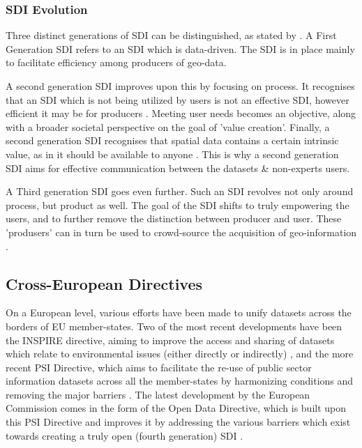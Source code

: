 \subsubsection{SDI Evolution}

Three distinct generations of SDI can be distinguished, as stated by \citet{expanding_knowledge_base}. A First Generation SDI refers to an SDI which is data-driven. The SDI is in place mainly to facilitate efficiency among producers of geo-data. 

A second generation SDI improves upon this by focusing on process. It recognises that an SDI which is not being utilized by users is not an effective SDI, however efficient it may be for producers \citep{geo1009_course}. Meeting user needs becomes an objective, along with a broader societal perspective on the goal of 'value creation'. Finally, a second generation SDI recognises that spatial data contains a certain intrinsic value, as in it should be available to anyone \citep{geo1009_course}. This is why a second generation SDI aims for effective communication between the datasets \& non-experts users.

A Third generation SDI goes even further. Such an SDI revolves not only around process, but product as well. The goal of the SDI shifts to truly empowering the users, and to further remove the distinction between producer and user. These 'produsers' can in turn be used to crowd-source the acquisition of geo-information \citep{geo1009_course}. 

\subsection{Cross-European Directives}

On a European level, various efforts have been made to unify datasets across the borders of EU member-states. Two of the most recent developments have been the INSPIRE directive, aiming to improve the access and sharing of datasets which relate to environmental issues (either directly or indirectly) \citep{inspire_directive_2007}, and the more recent PSI Directive, which aims to facilitate the re-use of public sector information datasets across all the member-states by harmonizing conditions and removing the major barriers \citep{psi_directive_law_2011}. The latest development by the European Commission comes in the form of the Open Data Directive, which is built upon this PSI Directive \citep{open_data_directive_2019} and improves it by addressing the various barriers which exist towards creating a truly open (fourth generation) SDI \citep{eucommission_psiToOpen}.

